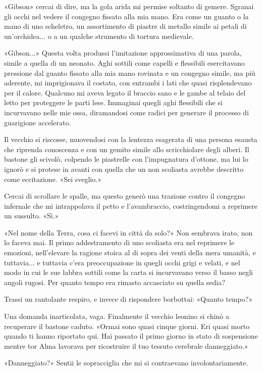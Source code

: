 «Gibson» cercai di dire, ma la gola arida mi permise soltanto di gemere.
Sgranai gli occhi nel vedere il congegno fissato alla mia mano. Era come
un guanto o la mano di uno scheletro, un assortimento di piastre di
metallo simile ai petali di un'orchidea... o a un qualche strumento di
tortura medievale.

«Gibson...» Questa volta produssi l'imitazione approssimativa di una
parola, simile a quella di un neonato. Aghi sottili come capelli e
flessibili esercitavano pressione dal guanto fissato alla mia mano
rovinata e un congegno simile, ma più aderente, mi imprigionava il
costato, con entrambi i lati che quasi risplendevano per il calore.
Qualcuno mi aveva legato il braccio sano e le gambe al telaio del letto
per proteggere le parti lese. Immaginai quegli aghi flessibili che si
incurvavano nelle mie ossa, diramandosi come radici per generare il
processo di guarigione accelerato.

Il vecchio si riscosse, muovendosi con la lentezza esagerata di una
persona esausta che riprenda conoscenza e con un gemito simile allo
scricchiolare degli alberi. Il bastone gli scivolò, colpendo le
piastrelle con l'impugnatura d'ottone, ma lui lo ignorò e si protese in
avanti con quella che un non scoliasta avrebbe descritto come
eccitazione. «Sei sveglio.»

Cercai di scrollare le spalle, ma questo generò una trazione contro il
congegno infernale che mi intrappolava il petto e l'avambraccio,
costringendomi a reprimere un sussulto. «Sì.»

«Nel nome della Terra, cosa ci facevi in città da solo?» Non sembrava
irato, non lo faceva mai. Il primo addestramento di uno scoliasta era
nel reprimere le emozioni, nell'elevare la ragione stoica al di sopra
dei venti della mera umanità, e tuttavia... e tuttavia c'era
preoccupazione in quegli occhi grigi e velati, e nel modo in cui le sue
labbra sottili come la carta si incurvavano verso il basso negli angoli
rugosi. Per quanto tempo era rimasto accasciato su quella sedia?

Trassi un rantolante respiro, e invece di rispondere borbottai: «Quanto
tempo?»

Una domanda inarticolata, vaga. Finalmente il vecchio leonino si chinò a
recuperare il bastone caduto. «Ormai sono quasi cinque giorni. Eri quasi
morto quando ti hanno riportato qui. Hai passato il primo giorno in
stato di sospensione mentre tor Alma lavorava per ricostruire il tuo
tessuto cerebrale danneggiato.»

«Danneggiato?» Sentii le sopracciglia che mi si contraevano
involontariamente.

